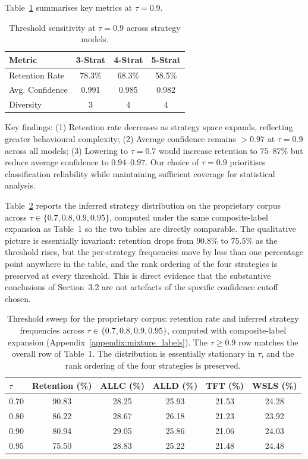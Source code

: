 \documentclass[a4paper,fleqn]{cas-sc}
\begin{document}
Table~\ref{tab:threshold_comparison} summarises key metrics at $\tau = 0.9$.

\begin{table}[pos=H]
\centering
\caption{Threshold sensitivity at $\tau = 0.9$ across strategy models.}
\label{tab:threshold_comparison}
\footnotesize
\begin{tabular}{lccc}
\toprule
\textbf{Metric} & \textbf{3-Strat} & \textbf{4-Strat} & \textbf{5-Strat} \\
\midrule
Retention Rate & 78.3\% & 68.3\% & 58.5\% \\
Avg. Confidence & 0.991 & 0.985 & 0.982 \\
Diversity & 3 & 4 & 4 \\
\bottomrule
\end{tabular}
\end{table}

Key findings: (1) Retention rate decreases as strategy space expands, reflecting greater behavioural complexity; (2) Average confidence remains $>0.97$ at $\tau = 0.9$ across all models; (3) Lowering to $\tau = 0.7$ would increase retention to $75$--$87\%$ but reduce average confidence to $0.94$--$0.97$. Our choice of $\tau = 0.9$ prioritises classification reliability while maintaining sufficient coverage for statistical analysis.

Table~\ref{tab:tau_sweep_distribution} reports the inferred strategy distribution on the proprietary corpus across $\tau \in \{0.7, 0.8, 0.9, 0.95\}$, computed under the same composite-label expansion as Table~1 so the two tables are directly comparable. The qualitative picture is essentially invariant: retention drops from $90.8\%$ to $75.5\%$ as the threshold rises, but the per-strategy frequencies move by less than one percentage point anywhere in the table, and the rank ordering of the four strategies is preserved at every threshold. This is direct evidence that the substantive conclusions of Section~3.2 are not artefacts of the specific confidence cutoff chosen.

\begin{table}[pos=H]
\centering
\caption{Threshold sweep for the proprietary corpus: retention rate and inferred strategy frequencies across $\tau \in \{0.7, 0.8, 0.9, 0.95\}$, computed with composite-label expansion (Appendix~\ref{appendix:mixture_labels}). The $\tau \geq 0.9$ row matches the overall row of Table~1. The distribution is essentially stationary in $\tau$, and the rank ordering of the four strategies is preserved.}
\label{tab:tau_sweep_distribution}
\footnotesize
\begin{tabular}{lccccc}
\toprule
$\tau$ & Retention (\%) & ALLC (\%) & ALLD (\%) & TFT (\%) & WSLS (\%) \\
\midrule
0.70 & 90.83 & 28.25 & 25.93 & 21.53 & 24.28 \\
0.80 & 86.22 & 28.67 & 26.18 & 21.23 & 23.92 \\
0.90 & 80.94 & 29.05 & 25.86 & 21.06 & 24.03 \\
0.95 & 75.50 & 28.83 & 25.22 & 21.48 & 24.48 \\
\bottomrule
\end{tabular}
\end{table}
\end{document}
